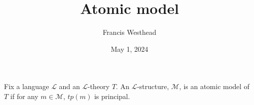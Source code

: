\documentclass[a4paper]{article}
\title{Atomic model}
\date{May 1, 2024}
\author{Francis Westhead}
\begin{document}
\maketitle
\par{Fix a language \(\mathcal {L}\) and an \(\mathcal {L}\)-theory \(T\). 
An \(\mathcal {L}\)-structure, \(\mathcal {M}\), is an atomic model of \(T\) if for any \(m \in   \mathcal {M}\), \(tp(m)\) is principal.}
\printbibliography
\end{document}
